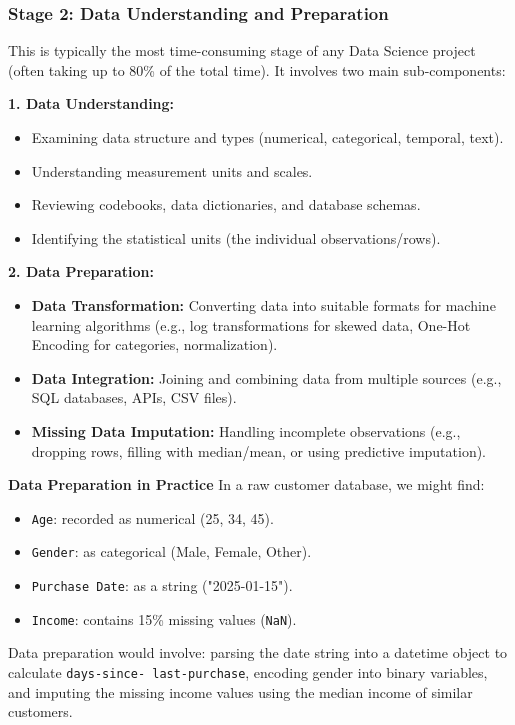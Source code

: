 \subsubsection{Stage 2: Data Understanding and Preparation}

This is typically the most time-consuming stage of any Data Science project (often taking up to 80\% of the total time). It involves two main sub-components:

\textbf{1. Data Understanding:}
\begin{itemize}
    \item Examining data structure and types (numerical, categorical, temporal, text).
    \item Understanding measurement units and scales.
    \item Reviewing codebooks, data dictionaries, and database schemas.
    \item Identifying the statistical units (the individual observations/rows).
\end{itemize}

\textbf{2. Data Preparation:}
\begin{itemize}
    \item \textbf{Data Transformation:} Converting data into suitable formats for machine learning algorithms (e.g., log transformations for skewed data, One-Hot Encoding for categories, normalization).
    \item \textbf{Data Integration:} Joining and combining data from multiple sources (e.g., SQL databases, APIs, CSV files).
    \item \textbf{Missing Data Imputation:} Handling incomplete observations (e.g., dropping rows, filling with median/mean, or using predictive imputation).
\end{itemize}

\vspace{0.15cm}
\begin{example}{\textbf{Data Preparation in Practice}}
In a raw customer database, we might find:
\begin{itemize}
    \item \texttt{Age}: recorded as numerical (25, 34, 45).
    \item \texttt{Gender}: as categorical (Male, Female, Other).
    \item \texttt{Purchase Date}: as a string ("2025-01-15").
    \item \texttt{Income}: contains 15\% missing values (\texttt{NaN}).
\end{itemize}

Data preparation would involve: parsing the date string into a datetime object to calculate \texttt{days-since- last-purchase}, encoding gender into binary variables, and imputing the missing income values using the median income of similar customers.
\end{example}


